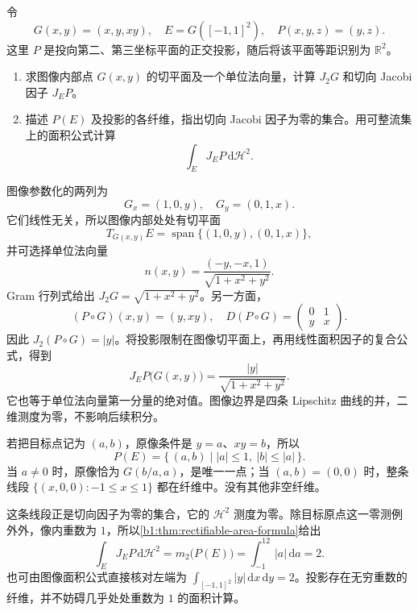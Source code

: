 \begin{exercise}\label{b1:ex:19-saddle-tangent-projection}
令
\[
 G(x,y)=(x,y,xy),
 \quad E=G([-1,1]^2),
 \quad P(x,y,z)=(y,z).
\]
这里 \(P\) 是投向第二、第三坐标平面的正交投影，随后将该平面等距识别为 \(\mathbb R^2\)。
\begin{enumerate}
\item\label{b1:item:19-saddle-tangent-normal}
求图像内部点 \(G(x,y)\) 的切平面及一个单位法向量，计算 \(J_2G\) 和切向 Jacobi 因子 \(J_EP\)。
\item\label{b1:item:19-saddle-critical-fiber}
描述 \(P(E)\) 及投影的各纤维，指出切向 Jacobi 因子为零的集合。用可整流集上的面积公式计算
\[
 \int_EJ_EP\,\mathrm d\mathcal H^2.
\]
\end{enumerate}
\end{exercise}
\begin{solution}
图像参数化的两列为
\[
 G_x=(1,0,y),
 \quad G_y=(0,1,x).
\]
它们线性无关，所以图像内部处处有切平面
\[
 T_{G(x,y)}E=\operatorname{span}\{(1,0,y),(0,1,x)\},
\]
并可选择单位法向量
\[
 n(x,y)=\frac{(-y,-x,1)}{\sqrt{1+x^2+y^2}}.
\]
Gram 行列式给出 \(J_2G=\sqrt{1+x^2+y^2}\)。另一方面，
\[
 (P\circ G)(x,y)=(y,xy),
 \quad D(P\circ G)=\begin{pmatrix}0&1\\y&x\end{pmatrix}.
\]
因此 \(J_2(P\circ G)=|y|\)。将投影限制在图像切平面上，再用线性面积因子的复合公式，得到
\[
 J_EP\bigl(G(x,y)\bigr)=
 \frac{|y|}{\sqrt{1+x^2+y^2}}.
\]
它也等于单位法向量第一分量的绝对值。图像边界是四条 Lipschitz 曲线的并，二维测度为零，不影响后续积分。

若把目标点记为 \((a,b)\)，原像条件是 \(y=a\)、\(xy=b\)，所以
\[
 P(E)=\{\,(a,b)\mid |a|\le1,\ |b|\le|a|\,\}.
\]
当 \(a\ne0\) 时，原像恰为 \(G(b/a,a)\)，是唯一一点；当 \((a,b)=(0,0)\) 时，整条线段 \(\{(x,0,0):-1\le x\le1\}\) 都在纤维中。没有其他非空纤维。

这条线段正是切向因子为零的集合，它的 \(\mathcal H^2\) 测度为零。除目标原点这一零测例外外，像内重数为 \(1\)，所以\cref{b1:thm:rectifiable-area-formula}给出
\[
 \int_EJ_EP\,\mathrm d\mathcal H^2
 =m_2\bigl(P(E)\bigr)=\int_{-1}^12|a|\,\mathrm da=2.
\]
也可由图像面积公式直接核对左端为 \(\int_{[-1,1]^2}|y|\,\mathrm dx\,\mathrm dy=2\)。投影存在无穷重数的纤维，并不妨碍几乎处处重数为 \(1\) 的面积计算。
\end{solution}

